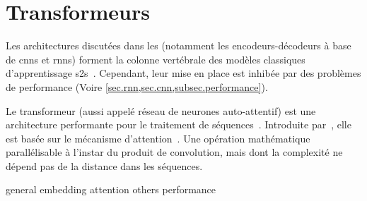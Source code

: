 \section{Transformeurs}

Les architectures discutées dans les 
(notamment les encodeurs-décodeurs à base de \glspl{cnn} et \glspl{rnn}) 
forment la colonne vertébrale des modèles classiques d'apprentissage \gls{s2s}~\cite{deep-nmt-survey}.
Cependant, leur mise en place est inhibée par des problèmes de performance 
(Voire \cref{sec.rnn,sec.cnn,subsec.performance}).

Le transformeur (aussi appelé réseau de neurones auto-attentif) est une architecture performante pour le traitement de séquences~\cite{Shim_Sung_2022}.
Introduite par~\cite{attention}, elle est basée sur le mécanisme d'attention~\cite{Larochelle_Hinton_2010}.
Une opération mathématique parallélisable à l'instar du produit de convolution, 
mais dont la complexité ne dépend pas de la distance dans les séquences.



{general}
{embedding}
{attention}
{others}
{performance}